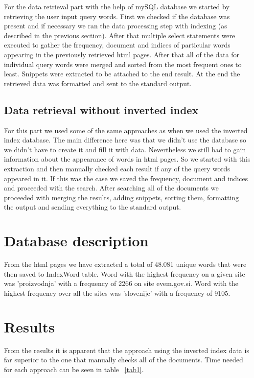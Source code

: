 \documentclass[9pt]{IEEEtran}
\begin{document}
For the data retrieval part with the help of mySQL database we started by retrieving the user input query words.
First we checked if the database was present and if necessary we ran the data processing step with indexing (as described in the previous section).
After that multiple select statements were executed to gather the frequency, document and indices of particular words appearing in the previously retrieved html pages.
After that all of the data for individual query words were merged and sorted from the most frequent ones to least.
Snippets were extracted to be attached to the end result.
At the end the retrieved data was formatted and sent to the standard output.

\subsection{Data retrieval without inverted index}

For this part we used some of the same approaches as when we used the inverted index database.
The main difference here was that we didn't use the database so we didn't have to create it and fill it with data.
Nevertheless we still had to gain information about the appearance of words in html pages.
So we started with this extraction and then manually checked each result if any of the query words appeared in it.
If this was the case we saved the frequency, document and indices and proceeded with the search.
After searching all of the documents we proceeded with merging the results, adding snippets, sorting them, formatting the output and sending everything to the standard output.

\section{Database description}

From the html pages we have extracted a total of 48.081 unique words that were then saved to IndexWord table.
Word with the highest frequency on a given site was 'proizvodnja' with a frequency of 2266 on site evem.gov.si.
Word with the highest frequency over all the sites was 'slovenije' with a frequency of 9105.

\section{Results}

From the results it is apparent that the approach using the inverted index data is far superior to the one that manually checks all of the documents.
Time needed for each approach can be seen in table ~\ref{tab1}.
\end{document}
